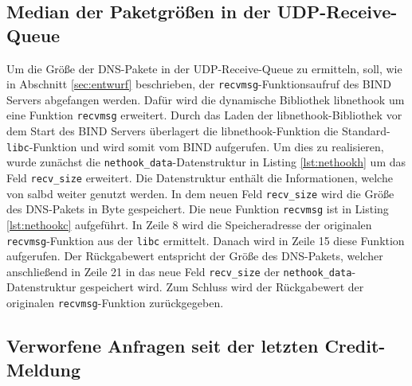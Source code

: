 \documentclass[a4paper, 12pt, BCOR10mm, DIV12, toc=bibliography, toc=listof, german]{scrbook}
\begin{document}
			


			\subsection*{Median der Paketgrößen in der UDP-Receive-Queue} %

				Um die Größe der DNS-Pakete in der UDP-Receive-Queue zu ermitteln, soll, wie in Abschnitt
				\ref{sec:entwurf} beschrieben, der \texttt{recvmsg}-Funktionsaufruf des BIND Servers
				abgefangen werden. Dafür wird die dynamische Bibliothek libnethook um eine Funktion
				\texttt{recvmsg} erweitert. Durch das Laden der libnethook-Bibliothek vor dem Start des BIND
				Servers überlagert die libnethook-Funktion die Standard-\texttt{libc}-Funktion und wird
				somit vom BIND aufgerufen. Um dies zu realisieren, wurde zunächst die
				\texttt{nethook\_data}-Datenstruktur in Listing \ref{lst:nethookh} um das Feld
				\texttt{recv\_size} erweitert. Die Datenstruktur enthält die Informationen, welche von salbd
				weiter genutzt werden. In dem neuen Feld \texttt{recv\_size} wird die Größe des DNS-Pakets
				in Byte gespeichert. Die neue Funktion \texttt{recvmsg} ist in Listing \ref{lst:nethookc}
				aufgeführt. In Zeile 8 wird die Speicheradresse der originalen \texttt{recvmsg}-Funktion aus
				der \texttt{libc} ermittelt. Danach wird in Zeile 15 diese Funktion
				aufgerufen. Der Rückgabewert entspricht der Größe des
				DNS-Pakets, welcher anschließend in Zeile 21 in das neue Feld \texttt{recv\_size} der
				\texttt{nethook\_data}-Datenstruktur gespeichert wird. Zum Schluss wird der Rückgabewert der
				originalen \texttt{recvmsg}-Funktion zurückgegeben.

			
			


			\subsection*{Verworfene Anfragen seit der letzten Credit-Meldung} %
\end{document}
